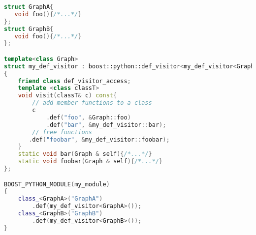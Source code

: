 \vspace{0.3cm}
\begin{lstlisting}[language=c++]
struct GraphA{
   void foo(){/*...*/}
};
struct GraphB{
   void foo(){/*...*/}
};

template<class Graph>
struct my_def_visitor : boost::python::def_visitor<my_def_visitor<Graph> >
{
    friend class def_visitor_access;
    template <class classT>
    void visit(classT& c) const{
        // add member functions to a class
        c
            .def("foo", &Graph::foo)
            .def("bar", &my_def_visitor::bar);
        // free functions 
       .def("foobar", &my_def_visitor::foobar);
    }
    static void bar(Graph & self){/*...*/}
    static void foobar(Graph & self){/*...*/}
};

BOOST_PYTHON_MODULE(my_module)
{ 
    class_<GraphA>("GraphA")
        .def(my_def_visitor<GraphA>());
    class_<GraphB>("GraphB")
        .def(my_def_visitor<GraphB>());
}
\end{lstlisting}
\vspace{-1.4cm}





